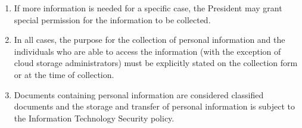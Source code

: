\begin{enumerate}
  \begin{enumerate}
   \item
    First and last Name
   \item
    Email address
   \item
    Phone number
   \item
    Education status. This includes the program, year, place of education, international, region of secondary graduation, student status, and courses taken.
   \item
    Date of birth
   \item
    Personal pronouns
   \item
    Preferred language
   \item
    Special needs
   \item
    Gender identification
   \item
    Age
   \item
    Views on the state of engineering education at their school
   \item
    Disclosure of personal experiences relating to their educational studies
   \item
    Ethnicity
   \item
    Nationality
  \end{enumerate}

 \item
  If more information is needed for a specific case, the President may grant special permission for the information to be collected.
 \item
  In all cases, the purpose for the collection of personal information and the individuals who are able to access the information (with the exception of cloud storage administrators) must be explicitly stated on the collection form or at the time of collection.
 \item
  Documents containing personal information are considered classified documents and the storage and transfer of personal information is subject to the Information Technology Security policy.
\end{enumerate}

